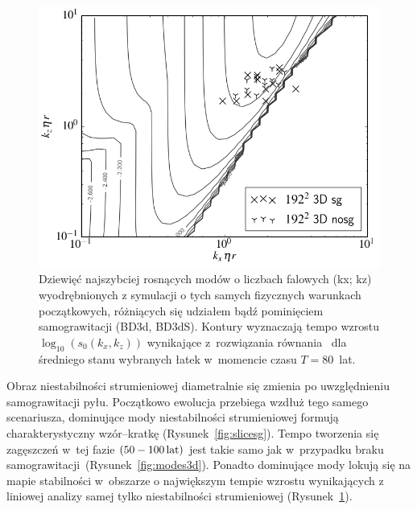 %
\begin{figure}[h]
   \centering
   \includegraphics[width=0.5\linewidth]{figures/3d_map_x3_50.png}
   \caption[Ewolucja najszybciej rosnących modów niestabilności strumieniowej w
            symulacjach BD3d i BD3dS.]
     {Dziewięć najszybciej rosnących modów o liczbach falowych (kx; kz)
      wyodrębnionych z symulacji o tych samych fizycznych warunkach
      początkowych, różniących się udziałem bądź pominięciem
      samograwitacji (BD3d, BD3dS).  Kontury wyznaczają tempo wzrostu
      $\log_{10}(s_0(k_x, k_z))$ wynikające z~rozwiązania równania~
       dla średniego stanu wybranych łatek w~momencie
      czasu $T = 80$~lat.}
   \label{fig:map3d}
\end{figure}
Obraz niestabilności strumieniowej diametralnie się zmienia po
uwzględnieniu samograwitacji pyłu. Początkowo ewolucja przebiega wzdłuż tego
samego scenariusza, dominujące mody niestabilności strumieniowej formują
charakterystyczny wzór--kratkę (Rysunek~\ref{fig:slicesg}). Tempo tworzenia się
zagęszczeń w~tej fazie $(50 - 100\hbox{$\thinspace\textrm{lat}$})$ jest takie samo jak w~przypadku braku
samograwitacji~(Rysunek~\ref{fig:modes3d}). Ponadto dominujące mody lokują się
na mapie stabilności w~obszarze o największym tempie wzrostu wynikających z
liniowej analizy samej tylko niestabilności strumieniowej 
(Rysunek~\ref{fig:map3d}).
%
